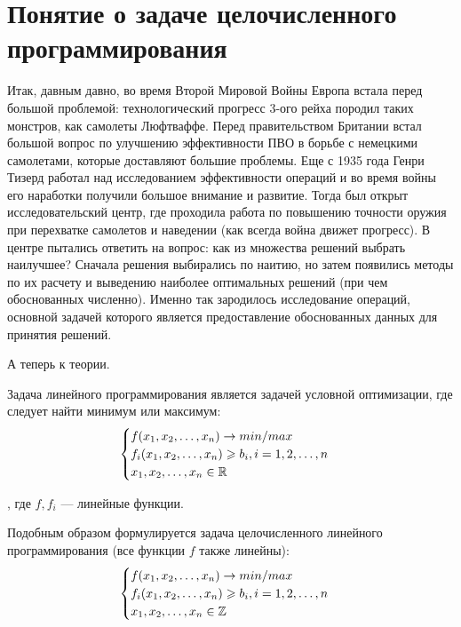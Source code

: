 \documentclass[../../main.tex]{subfiles}
\begin{document}
\section{Понятие о задаче целочисленного программирования}
Итак, давным давно, во время Второй Мировой Войны Европа встала
перед большой проблемой: технологический прогресс 3-ого рейха
породил таких монстров, как самолеты Люфтваффе. Перед правительством
Британии встал большой вопрос по улучшению эффективности ПВО в борьбе
с немецкими самолетами, которые доставляют большие проблемы. Еще с
1935 года Генри Тизерд работал над исследованием эффективности операций
и во время войны его наработки получили большое внимание и развитие. Тогда
был открыт исследовательский центр, где проходила работа по повышению
точности оружия при перехватке самолетов и наведении (как всегда 
война движет прогресс). В центре пытались ответить на вопрос: как из множества
решений выбрать наилучшее? Сначала решения выбирались по наитию, но затем 
появились методы по их расчету и выведению наиболее оптимальных решений (при чем
обоснованных численно). Именно так зародилось исследование операций, основной 
задачей которого является предоставление обоснованных 
данных для принятия решений.

А теперь к теории.

Задача линейного программирования является задачей условной оптимизации, где
следует найти минимум или максимум:
\begin{equation}
    \begin{cases}
        f(x_1, x_2, \dots, x_n) \to min/max \\
        f_i(x_1, x_2, \dots, x_n) \geqslant b_i, i = 1,2,\dots,n \\
        x_1, x_2, \dots, x_n \in \mathbb{R}
    \end{cases}
\end{equation}

, где $f, f_i$  --- линейные функции.

Подобным образом формулируется задача целочисленного линейного программирования
(все функции $f$ также линейны):
\begin{equation}
    \begin{cases}
        f(x_1, x_2, \dots, x_n) \to min/max \\
        f_i(x_1, x_2, \dots, x_n) \geqslant b_i, i = 1,2,\dots,n \\
        x_1, x_2, \dots, x_n \in \mathbb{Z}
    \end{cases}
\end{equation}
\end{document}
